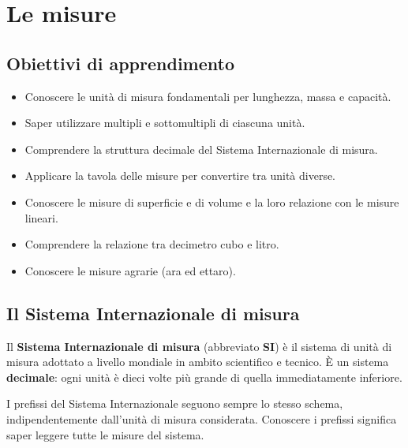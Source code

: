 
\chapter{Le misure}

\section*{Obiettivi di apprendimento}
\begin{itemize}[noitemsep]
    \item Conoscere le unità di misura fondamentali per lunghezza, massa e capacità.
    \item Saper utilizzare multipli e sottomultipli di ciascuna unità.
    \item Comprendere la struttura decimale del Sistema Internazionale di misura.
    \item Applicare la tavola delle misure per convertire tra unità diverse.
    \item Conoscere le misure di superficie e di volume e la loro relazione con le misure lineari.
    \item Comprendere la relazione tra decimetro cubo e litro.
    \item Conoscere le misure agrarie (ara ed ettaro).
\end{itemize}

\section{Il Sistema Internazionale di misura}

\begin{definizione}
    Il \textbf{Sistema Internazionale di misura} (abbreviato \textbf{SI}) è il sistema di unità di misura adottato a livello mondiale in ambito scientifico e tecnico. È un sistema \textbf{decimale}: ogni unità è dieci volte più grande di quella immediatamente inferiore.
\end{definizione}

I prefissi del Sistema Internazionale seguono sempre lo stesso schema, indipendentemente dall'unità di misura considerata. Conoscere i prefissi significa saper leggere tutte le misure del sistema.

